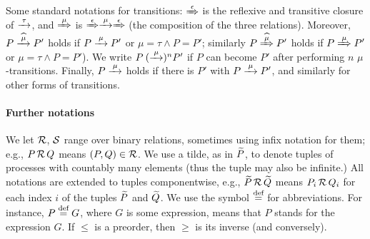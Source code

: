
Some standard notations for transitions: $\Arr\epsilon$ is the 
reflexive and transitive closure of $\arr\tau$, and 
$\Arr \mu $ is $\Arr\epsilon \arr\mu \Arr\epsilon$ (the
composition of the three relations).
Moreover,   
$P \arcap \mu P'$ holds if $P \arr\mu P'$ or $\mu =\tau \wedge P = P'$; similarly 
$P \Arcap \mu P'$ holds if $P \Arr\mu P'$ or $\mu =\tau \wedge P = P'$).
We write $P \:(\arr\mu)^n P'$ if $P$ can become $P'$ after performing
$n$ $\mu$-transitions. Finally, $P \arr\mu$ holds if there is $P'$
with $P \arr\mu P'$, and similarly for other forms of transitions.

\paragraph{Further notations}
We let $\R$, $\S$ range over binary relations, sometimes using 
 infix notation for them; e.g., 
$P \,\R\, Q$ means $(P,Q) \in \R$.
We use a tilde, as in  $\til P$, to denote tuples of processes with
countably many elements (thus the tuple may also be infinite.)
All notations are extended to tuples componentwise,
e.g., $\til P \,\R\, \til Q$ means $P_i \,\R\, Q_i$ for each  
index $i$ of the tuples $\til P$ and $\til Q$.
We use the symbol $\DSdefi$ for abbreviations. For instance, $P \DSdefi G $, where
$G$ is some expression, means that $P$ stands for the expression $G$.
If $\leq$ is a preorder, then  $\geq$  is its inverse (and
conversely).


